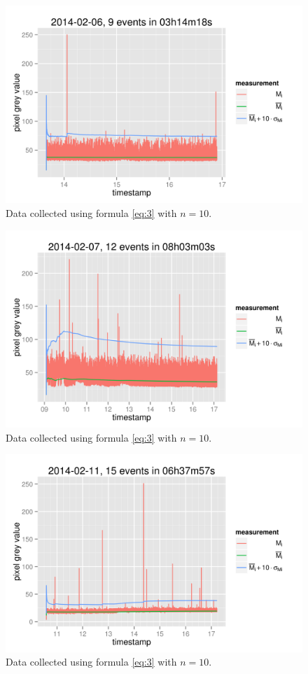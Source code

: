 \documentclass[a4paper,12pt]{article}
\begin{document}
\begin{figure}[h!]
  \centering
  \includegraphics{20140206.png}
  \caption{Data collected using formula \ref{eq:3} with $n=10$.}\label{fig:1}
\end{figure}

\begin{figure}[h!]
  \centering
  \includegraphics{20140207.png}
  \caption{Data collected using formula \ref{eq:3} with $n=10$.}\label{fig:3}
\end{figure}

\begin{figure}[h!]
  \centering
  \includegraphics{20140211.png}
  \caption{Data collected using formula \ref{eq:3} with $n=10$.}
\end{figure}
\end{document}

